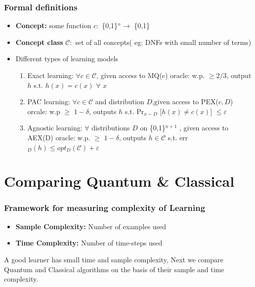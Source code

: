 \documentclass{beamer}
\begin{document}
\begin{frame}\frametitle{Formal definitions}
\begin{itemize}
\item \textbf{Concept:} some function $c:$ \{0,1\}$^{n} \rightarrow$ \{0,1\} 
\item \textbf{Concept class} $\mathcal{C}:$ set of all concepts( eg: DNFs with small number of terms)
\item Different types of learning models

\begin{enumerate}
    \item Exact learning:  $\forall c \in \mathcal{C}$, given access to MQ(c) 
    oracle: w.p. $\geq 2/3$, output $h$ s.t. $h(x)=c(x)$ $\forall$ $x$  
    \item PAC learning: $\forall c \in \mathcal{C}$ and distribution $D$,given access to
    PEX($c, D$) orcale: w.p $\geq$ $1-\delta$, outputs $h$ s.t. Pr$_{x \sim   D}$ [$h(x) \neq c(x)$] $\leq \varepsilon$  
    \item Agnostic learning: $\forall$ distributions $D$ on \{0,1\}$^{n+1}$ 
    , given access to AEX(D) oracle: w.p. $\geq$ $1-\delta$, outputs $h \in \mathcal{C}$ s.t. err$_{D}(h) \leq opt_{D}(\mathcal{C}) + \varepsilon$
\end{enumerate}
 
\end{itemize}
\end{frame}

\section{Comparing Quantum \& Classical}
\begin{frame}\frametitle{Framework for measuring complexity of Learning}
\begin{itemize}
  \item    \textbf{Sample Complexity:} Number of examples used 
  \item    \textbf{Time Complexity:} Number of time-steps used 
\end{itemize} 



A good learner has small time and sample complexity, Next we compare Quantum and
Classical algorithms on the basis of their sample and time complexity.
\end{frame}
\end{document}
